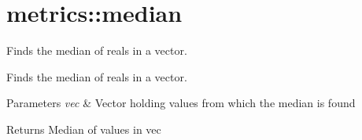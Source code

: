 \hypertarget{group__median}{}\section{metrics\+:\+:median}
\label{group__median}


Finds the median of reals in a vector.  


Finds the median of reals in a vector. 


\begin{DoxyParams}{Parameters}
{\em vec} & Vector holding values from which the median is found \\
\hline
\end{DoxyParams}
\begin{DoxyReturn}{Returns}
Median of values in vec 
\end{DoxyReturn}
